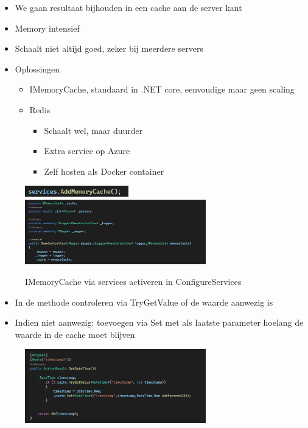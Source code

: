 \documentclass{article}
\begin{document}
\begin{itemize}
    \item We gaan resultaat bijhouden in een cache aan de server kant
    \item Memory intensief
    \item Schaalt niet altijd goed, zeker bij meerdere servers
    \item Oplossingen
    \begin{itemize}
        \item IMemoryCache, standaard in .NET core, eenvoudige maar geen scaling
        \item Redis
        \begin{itemize}
            \item Schaalt wel, maar duurder
            \item Extra service op Azure
            \item Zelf hosten als Docker container
        \end{itemize}
    \end{itemize}
\end{itemize}

\begin{figure}[H]
    \centering
    \includegraphics[width=0.4\textwidth]{caching-imemorycache.png}
    \includegraphics[width=0.7\textwidth]{caching-imemorycache2.png}
    \caption{IMemoryCache via services activeren in ConfigureServices}
\end{figure}

\begin{itemize}
    \item In de methode controleren via TryGetValue of de waarde aanwezig is
    \item Indien niet aanwezig: toevoegen via Set met als laatste parameter hoelang de waarde in de cache moet blijven
\end{itemize}

\begin{figure}[H]
    \centering
    \includegraphics[width=0.7\textwidth]{caching-output-trygetvalue.png}
    \caption{}
\end{figure}
\end{document}
